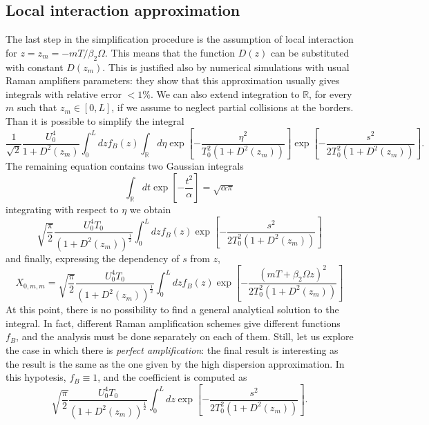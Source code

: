 \documentclass[10pt, lettersize, journal, onecolumn]{IEEEtran}
\begin{document}
\subsection{Local interaction approximation}
The last step in the simplification procedure is the assumption of local interaction for $z=z_m=-mT/\beta_2\Omega$. This means that the function $D(z)$ can be substituted with constant $D(z_m)$. This is justified also by numerical simulations with usual Raman amplifiers parameters: they show that this approximation usually gives integrals with relative error $<1\%$. 
We can also extend integration to $\mathbb{R}$, for every $m$ such that $z_m \in [0, L]$, if we assume to neglect partial collisions at the borders.
Than it is possible to simplify the integral
\begin{equation}
	\dfrac{1}{\sqrt{2}} \dfrac{U_0^4}{1+D^2(z_m)}  \int_{0}^{L}dz f_B(z) \int_{\mathbb{R}}d\eta
	\exp\left[-\dfrac{\eta^2}{T_0^2(1+D^2(z_m))} \right] \exp\left[-\dfrac{s^2}{2T_0^2(1+D^2(z_m))} \right].
\end{equation}
The remaining equation contains two Gaussian integrals
\begin{equation}
	\int_{\mathbb{R}}dt \exp\left[-\dfrac{t^2}{\alpha}\right] = \sqrt{\alpha \pi} 
\end{equation}
integrating with respect to $\eta$ we obtain
\begin{equation}
	\sqrt{\dfrac{\pi}{2}}\dfrac{U_0^4 T_0}{(1+D^2(z_m))^{\frac{1}{2}}} \int_{0}^{L} dz f_B(z) \exp\left[-\dfrac{s^2}{2T_0^2(1+D^2(z_m))} \right]
\end{equation}
and finally, expressing the dependency of $s$ from $z$, 
\begin{equation}\label{THE_INTEGRAL}
	X_{0, m, m} = \sqrt{\dfrac{\pi}{2}}\dfrac{U_0^4 T_0}{(1+D^2(z_m))^{\frac{1}{2}}} \int_{0}^{L} dz f_B(z) \exp\left[-\dfrac{(mT+\beta_2\Omega z)^2}{2T_0^2(1+D^2(z_m))} \right]
\end{equation} 
At this point, there is no possibility to find a general analytical solution to the integral. In fact, different Raman amplification schemes give different functions $f_B$, and the analysis must be done separately on each of them. 
Still, let us explore the case in which there is \textit{perfect amplification}: the final result is interesting as the result is the same as the one given by the high dispersion approximation. In this hypotesis, $f_B \equiv 1$, and the coefficient is computed as
\begin{equation}\label{pa-first}
	\sqrt{\dfrac{\pi}{2}}\dfrac{U_0^4 T_0}{(1+D^2(z_m))^{\frac{1}{2}}} \int_{0}^{L}dz \exp\left[-\dfrac{s^2}{2T_0^2(1+D^2(z_m))} \right].
\end{equation}
\end{document}
